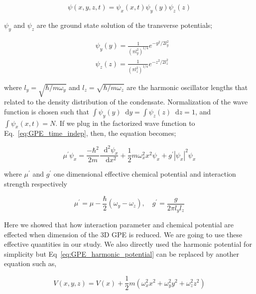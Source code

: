 \documentclass[a4paper,times,hidelinks,12pt]{article}
\newcommand*\dif{\mathop{}\!\mathrm{d}}
\begin{document}
\begin{equation}
\label{eq:GPE_time_indep_wave_func_seperated}
\psi(x, y, z, t) = \psi_x(x, t)\psi_y(y)\psi_z(z)
\end{equation}

\noindent $\psi_y$ and $\psi_z$ are the ground state solution of the transverse potentials;

\begin{equation}
\begin{split}
\label{eq:GPE_x_y_wave}
& \psi_y(y) = \frac{1}{{(\pi l_y^2)}^{1/4}}e^{-y^2/2l_y^2} \\
& \psi_z(z) = \frac{1}{{(\pi l_z^2)}^{1/4}}e^{-z^2/2l_z^2}
\end{split}
\end{equation}

\noindent where $l_y = \sqrt{\hbar/m\omega_y}$ and $l_z = \sqrt{\hbar/m\omega_z}$ are the harmonic oscillator lengths that related to the density distribution of the condensate. Normalization of the wave function is chosen such that $\int \psi_y(y) \dif y = \int \psi_z(z) \dif z = 1$, and $\int \psi_x(x, t) = N$. If we plug in the factorized wave function to Eq.~\eqref{eq:GPE_time_indep}, then, the equation becomes;

\begin{equation}
\label{eq:GPE_1D_harmonic}
\mu^{\prime}\psi_x = \frac{-\hbar^2}{2m}\frac{\dif^2\psi_x}{\dif x^2} + \frac{1}{2}m\omega_x^2 x^2\psi_x + g^{\prime}|\psi_x|^2\psi_x 
\end{equation}

\noindent where $\mu^{\prime}$ and $g^{\prime}$ one dimensional effective chemical potential and interaction strength respectively

\begin{equation}
\label{eq:GPE_1D_chem_inter}
\mu^{\prime} = \mu - \frac{\hbar}{2}(\omega_y - \omega_z), \quad g^{\prime} = \frac{g}{2\pi l_y l_z}
\end{equation}

\noindent Here we showed that how interaction parameter and chemical potential are effected when dimension of the 3D GPE is reduced. We are going to use these effective quantities in our study. We also directly used the harmonic potential for simplicity but Eq~\eqref{eq:GPE_harmonic_potential} can be replaced by another equation such as,

\begin{equation}
\label{eq:GPE_harmonic_potential_plus_pot}
V(x, y, z) = V(x) + \frac{1}{2}m(\omega_x^2 x^2 + \omega_y^2y^2 + \omega_z^2z^2)
\end{equation}
\end{document}
